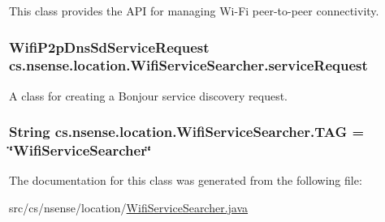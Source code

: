 This class provides the A\-P\-I for managing Wi-\/\-Fi peer-\/to-\/peer connectivity. \hypertarget{classcs_1_1nsense_1_1location_1_1_wifi_service_searcher_ab2e780a9115f0114f5097bb277eb0293}{
\subsubsection[{service\-Request}]{\setlength{\rightskip}{0pt plus 5cm}Wifi\-P2p\-Dns\-Sd\-Service\-Request cs.\-nsense.\-location.\-Wifi\-Service\-Searcher.\-service\-Request\hspace{0.3cm}{\ttfamily [private]}}}\label{classcs_1_1nsense_1_1location_1_1_wifi_service_searcher_ab2e780a9115f0114f5097bb277eb0293}
A class for creating a Bonjour service discovery request. \hypertarget{classcs_1_1nsense_1_1location_1_1_wifi_service_searcher_af93ca1c31745948edca0ce6177fe0eb3}{
\subsubsection[{T\-A\-G}]{\setlength{\rightskip}{0pt plus 5cm}String cs.\-nsense.\-location.\-Wifi\-Service\-Searcher.\-T\-A\-G = \char`\"{}Wifi\-Service\-Searcher\char`\"{}\hspace{0.3cm}{\ttfamily [private]}}}\label{classcs_1_1nsense_1_1location_1_1_wifi_service_searcher_af93ca1c31745948edca0ce6177fe0eb3}


The documentation for this class was generated from the following file\-:\begin{DoxyCompactItemize}
\item 
src/cs/nsense/location/\hyperlink{_wifi_service_searcher_8java}{Wifi\-Service\-Searcher.\-java}\end{DoxyCompactItemize}
